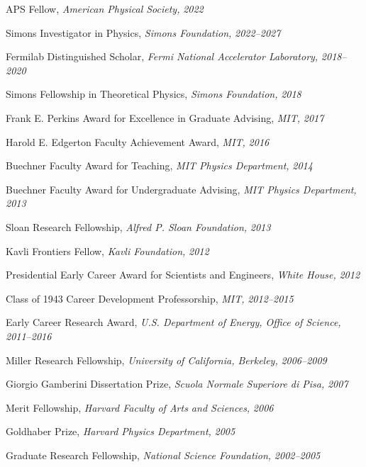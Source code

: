 \bbl
\item APS Fellow, \emph{American Physical Society, }\emph{2022}
\item Simons Investigator in Physics, \emph{Simons Foundation, }\emph{2022--2027}
\item Fermilab Distinguished Scholar, \emph{Fermi National Accelerator Laboratory, }\emph{2018--2020}
\item Simons Fellowship in Theoretical Physics, \emph{Simons Foundation, }\emph{2018}
\item Frank E. Perkins Award for Excellence in Graduate Advising, \emph{MIT, }\emph{2017}
\item Harold E. Edgerton Faculty Achievement Award, \emph{MIT, }\emph{2016}
\item Buechner Faculty Award for Teaching, \emph{MIT Physics Department, }\emph{2014}
\item Buechner Faculty Award for Undergraduate Advising, \emph{MIT Physics Department, }\emph{2013}
\item Sloan Research Fellowship, \emph{Alfred P. Sloan Foundation, }\emph{2013}
\item Kavli Frontiers Fellow, \emph{Kavli Foundation, }\emph{2012}
\item Presidential Early Career Award for Scientists and Engineers, \emph{White House, }\emph{2012}
\item Class of 1943 Career Development Professorship, \emph{MIT, }\emph{2012--2015}
\item Early Career Research Award, \emph{U.S. Department of Energy, Office of Science, }\emph{2011--2016}
\item Miller Research Fellowship, \emph{University of California, Berkeley, }\emph{2006--2009}
\item Giorgio Gamberini Dissertation Prize, \emph{Scuola Normale Superiore di Pisa, }\emph{2007}
\item Merit Fellowship, \emph{Harvard Faculty of Arts and Sciences, }\emph{2006}
\item Goldhaber Prize, \emph{Harvard Physics Department, }\emph{2005}
\item Graduate Research Fellowship, \emph{National Science Foundation, }\emph{2002--2005}
\el
